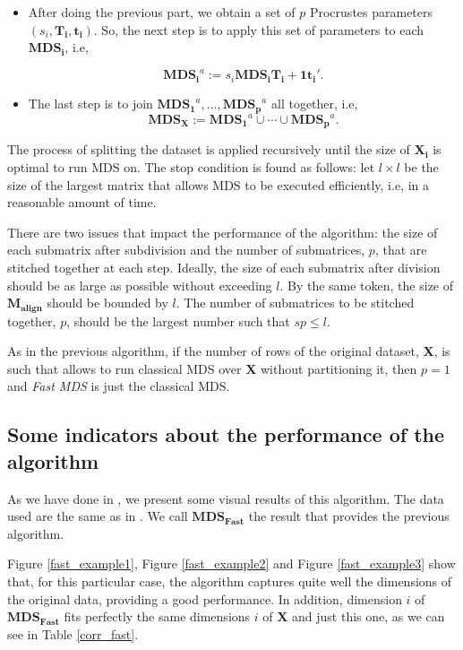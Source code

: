 \documentclass[11pt]{report}
\begin{document}
\begin{itemize}
\item After doing the previous part, we obtain a set of $p$ Procrustes 
parameters $(s_i, \mathbf{T_i},  \mathbf{t_i})$. So, the next step is to 
apply this set of parameters to each $\mathbf{MDS_i}$, i.e, 

\[
\mathbf{MDS_i}^a := s_i \mathbf{MDS_i} \mathbf{T_i} + \mathbf{1t_i'}.
\]

\item The last step is to join $\mathbf{MDS_1}^a, \dots,  \mathbf{MDS_p}^a$ 
all together, i.e, 
\[
\mathbf{MDS_X}:= \mathbf{MDS_1}^a \cup \cdots \cup \mathbf{MDS_p}^a.
\]

\end{itemize}

\indent The process of splitting the dataset is applied recursively 
until the size of $\mathbf{X_i}$ is optimal to run MDS on. The stop condition 
is found as follows: let $l \times l$ be the size of the largest matrix that 
allows MDS to be executed efficiently, i.e, in a reasonable amount of time. 

\indent There are two issues that impact the performance of the algorithm: 
the size of each submatrix after subdivision and the number of submatrices, $p$, 
that are stitched together at each step. Ideally, the size of each submatrix 
after division should be as large as possible without exceeding $l$. By the same 
token, the size of $\mathbf{M_{align}}$ should be bounded by $l$. The number of 
submatrices to be stitched together, $p$, should be the largest number such 
that $sp \leq l$.

\indent As in the previous algorithm, if the number of rows of the original 
dataset, \textbf{X}, is such that allows to run classical MDS over \textbf{X} 
without partitioning it, then $p=1$ and \textit{Fast MDS} is just the 
classical MDS.


\subsection{Some indicators about the performance of the algorithm}
As we have done in , we present some visual results of
this algorithm. The data used are the same as in . We
call $\mathbf{MDS_{Fast}}$ the result that provides the previous algorithm.

\indent Figure \ref{fast_example1}, Figure \ref{fast_example2} and
Figure \ref{fast_example3} show that, for this particular case,
the algorithm captures quite well the dimensions of the original data, 
providing a good performance. In addition, dimension $i$ of 
$\mathbf{MDS_{Fast}}$ fits perfectly the same dimensions $i$ of \textbf{X} and 
just this one, as we can see in Table \ref{corr_fast}.
\end{document}
